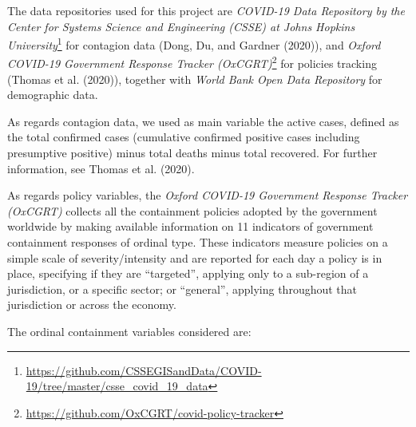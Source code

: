 \documentclass[
  6pt,
]{article}
\begin{document}
The data repositories used for this project are \emph{COVID-19 Data
Repository by the Center for Systems Science and Engineering (CSSE) at
Johns Hopkins University}\footnote{\url{https://github.com/CSSEGISandData/COVID-19/tree/master/csse_covid_19_data}}
for contagion data (Dong, Du, and Gardner (2020)), and \emph{Oxford
COVID-19 Government Response Tracker (OxCGRT)}\footnote{\url{https://github.com/OxCGRT/covid-policy-tracker}}
for policies tracking (Thomas et al. (2020)), together with \emph{World
Bank Open Data Repository} for demographic data.

As regards contagion data, we used as main variable the active cases,
defined as the total confirmed cases (cumulative confirmed positive
cases including presumptive positive) minus total deaths minus total
recovered. For further information, see Thomas et al. (2020).

As regards policy variables, the \emph{Oxford COVID-19 Government
Response Tracker (OxCGRT)} collects all the containment policies adopted
by the government worldwide by making available information on 11
indicators of government containment responses of ordinal type. These
indicators measure policies on a simple scale of severity/intensity and
are reported for each day a policy is in place, specifying if they are
``targeted'', applying only to a sub-region of a jurisdiction, or a
specific sector; or ``general'', applying throughout that jurisdiction
or across the economy.

The ordinal containment variables considered are:
\end{document}
